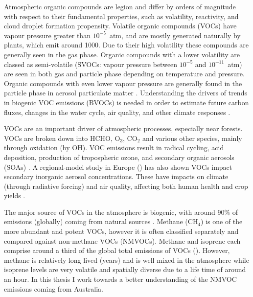   Atmospheric organic compounds are legion and differ by orders of magnitude with respect to their fundamental properties, such as volatility, reactivity, and cloud droplet formation propensity.
  Volatile organic compounds (VOCs) have vapour pressure greater than $10^{-5}$~atm, and are mostly generated naturally by plants, which emit around 1000\tgpyr \citep{Guenther1995, Glasius2016}.
  Due to their high volatility these compounds are generally seen in the gas phase.
  Organic compounds with a lower volatility are classed as semi-volatile (SVOCs: vapour pressure between $10^{-5}$ and $10^{-11}$~atm) are seen in both gas and particle phase depending on temperature and pressure.
  Organic compounds with even lower vapour pressure are generally found in the particle phase in aerosol particulate matter \citep{Glasius2016}.
  Understanding the drivers of trends in biogenic VOC emissions (BVOCs) is needed in order to estimate future carbon fluxes, changes in the water cycle, air quality, and other climate responses \citep{Yue2015}.
  

  VOCs are an important driver of atmospheric processes, especially near forests.
  VOCs are broken down into HCHO, O$_3$, CO$_2$ and various other species, mainly through oxidation (by OH).
  VOC emissions result in radical cycling, acid deposition, production of tropospheric ozone, and secondary organic aerosols (SOAs) \citep{Atkinson2000, Kanakidou2005}.
  A regional-model study in Europe (\cite{Aksoyoglu2017}) has also shown VOCs impact secondary inorganic aerosol concentrations.
  These have impacts on climate (through radiative forcing) and air quality, affecting both human health and crop yields \citep{IPCC_Chapter2, Avnery2011, Lelieveld2015}.
  
  The major source of VOCs in the atmosphere is biogenic, with around 90\% of emissions (globally) coming from natural sources \citep{Guenther1995,Guenther2006, Millet2006}.
  Methane (CH$_4$) is one of the more abundant and potent VOCs, however it is often classified separately and compared against non-methane VOCs (NMVOCs).
  Methane and isoprene each comprise around a third of the global total emissions of VOCs (\cite{Guenther2006}).
  However, methane is relatively long lived (years) and is well mixed in the atmosphere while isoprene levels are very volatile and spatially diverse due to a life time of around an hour.
  In this thesis I work towards a better understanding of the NMVOC emissions coming from Australia.
  
